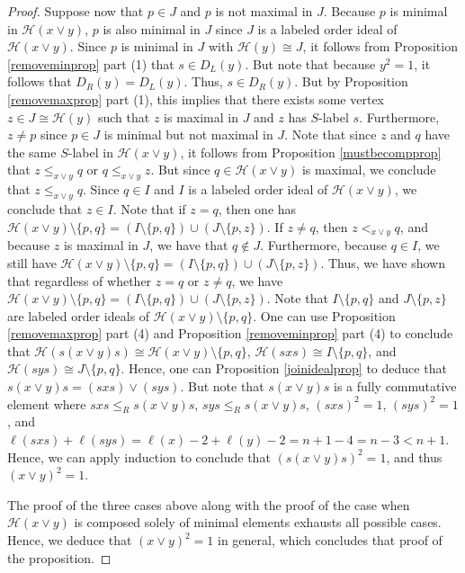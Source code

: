 \documentclass[10pt,a4paper]{amsart}
\def\H#1{\mathcal{H}(#1)}
\def\weakr{\leq_{R}}
\begin{document}
\begin{proof}
    Suppose now that $ p\in J$ and $ p$ is not maximal in $ J$. Because $p$ is minimal in $ \H{x\vee y}$, $ p$ is also minimal in $J$ since $J$ is a labeled order ideal of $ \H{x\vee y}$. Since $ p$ is minimal in $J$ with $ \H{y} \cong J$, it follows from Proposition \ref{removeminprop} part (1) that $s \in D_{L}(y) $. But note that because $y^{2}  =1$, it follows that $ D_{R}(y) = D_{L}(y)$. Thus, $ s \in D_{R}(y)$. But by Proposition \ref{removemaxprop} part (1), this implies that there exists some vertex $ z \in J \cong \H{y}$ such that $ z$ is maximal in $J$ and $ z$ has $S$-label $s$. Furthermore, $ z\neq p$ since $ p\in J$ is minimal but not maximal in $J$. Note that since $ z$ and $ q$ have the same $ S$-label in $ \H{x\vee y}$, it follows from Proposition \ref{mustbecompprop} that $ z \leq_{x\vee y} q$ or $ q \leq_{x\vee y} z$. But since $ q\in \H{x\vee y}$ is maximal, we conclude that $ z \leq_{x\vee y} q$. Since $ q\in I$ and $I$ is a labeled order ideal of $ \H{x\vee y}$, we conclude that $ z\in I$. Note that if $ z = q$, then one has $ \H{x\vee y} \setminus \{ p,q \} = (I \setminus \{  p,q \}) \cup (J \setminus \{  p,z \} ) $. If $ z\neq q$, then $ z <_{x\vee y} q$, and because $ z$ is maximal in $J$, we have that $ q\notin J$. Furthermore, because $ q\in I$, we still have $ \H{x\vee y} \setminus \{ p,q \} = (I \setminus \{ p,q \} ) \cup (J \setminus \{ p,z \}) $. Thus, we have shown that regardless of whether $ z=q$ or $ z\neq q$, we have $ \H{x\vee y} \setminus \{ p,q \} = (I \setminus \{ p,q \} ) \cup (J \setminus \{ p,z \}) $. Note that $I \setminus \{ p,q \} $ and $ J \setminus \{ p,z \}$ are labeled order ideals of $ \H{x\vee y} \setminus \{ p,q \}$. One can use Proposition \ref{removemaxprop} part (4) and Proposition \ref{removeminprop} part (4) to conclude that $ \H{s(x\vee y)s} \cong \H{x\vee y}\setminus \{ p,q \}$, $ \H{sxs} \cong I \setminus \{ p,q \}$, and $ \H{sys} \cong J \setminus \{  p,q \}$. Hence, one can Proposition \ref{joinidealprop} to deduce that $ s(x\vee y)s = (sxs)\vee (sys)$. But note that $ s(x\vee y)s$ is a fully commutative element where $ sxs \weakr s(x\vee y)s$, $ sys\weakr s(x\vee y)s$, $ (sxs)^{2} = 1$, $ (sys)^{2}=1$, and $ \ell(sxs)+\ell(sys) = \ell(x) - 2 + \ell(y) -2 = n+1 - 4 = n-3 < n+1$. Hence, we can apply induction to conclude that $ (s(x\vee y)s)^{2} = 1$, and thus $ (x\vee y)^{2} = 1$.

    The proof of the three cases above along with the proof of the case when $ \H{x\vee y}$ is composed solely of minimal elements exhausts all possible cases. Hence, we deduce that $ (x\vee y)^{2} = 1$ in general, which concludes that proof of the proposition.

\end{proof}
\end{document}
